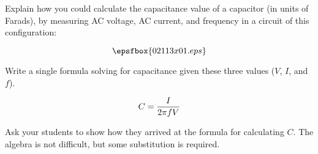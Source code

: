 

Explain how you could calculate the capacitance value of a capacitor (in units of Farads), by measuring AC voltage, AC current, and frequency in a circuit of this configuration:

$$\epsfbox{02113x01.eps}$$

Write a single formula solving for capacitance given these three values ($V$, $I$, and $f$).







$$C = {I \over {2 \pi f V}}$$







Ask your students to show how they arrived at the formula for calculating $C$.  The algebra is not difficult, but some substitution is required.




